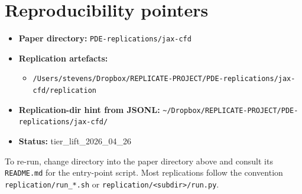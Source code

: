 \documentclass[11pt]{article}
\begin{document}
\section{Reproducibility pointers}\label{sec:repro}
\begin{itemize}
\item \textbf{Paper directory:} \texttt{PDE-replications/jax-cfd}
\item \textbf{Replication artefacts:}
\begin{itemize}
\item \texttt{/Users/stevens/Dropbox/REPLICATE-PROJECT/PDE-replications/jax-cfd/replication}
\end{itemize}
\item \textbf{Replication-dir hint from JSONL:} \texttt{\textasciitilde{}/Dropbox/REPLICATE-PROJECT/PDE-replications/jax-cfd/}
\item \textbf{Status:} tier\_lift\_2026\_04\_26
\end{itemize}

To re-run, change directory into the paper directory above and consult its \texttt{README.md} for the entry-point script. Most replications follow the convention \texttt{replication/run\_*.sh} or \texttt{replication/<subdir>/run.py}.
\end{document}
